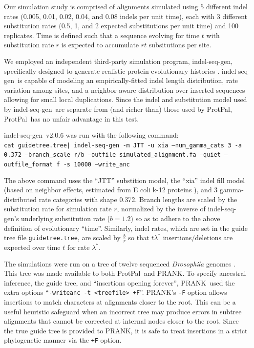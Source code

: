 \documentclass{article}
\begin{document}
\newcommand{\indelseqgen}{indel-seq-gen}
\newcommand{\protpal}{ProtPal}
\newcommand{\prank}{PRANK}
\newcommand{\clustalw}{CLUSTALW}
\newcommand{\rateRatio}[1]{\frac{\hat{\lambda}^{#1}_{\hat{H}}}{\lambda^#1}}
Our simulation study is comprised of alignments simulated  using 5 different indel rates (0.005, 0.01, 0.02, 0.04, and 0.08 indels per unit time), each with 3 different substitution rates (0.5, 1, and 2 expected  substitutions per unit time) and 100 replicates.  
Time is defined such that a sequence evolving for time $t$ with substitution rate $r$ is expected to accumulate $rt$ subsitutions per site. 

 We employed an independent third-party simulation program, \indelseqgen, specifically designed to generate realistic protein evolutionary histories \cite{StropeEtAl2009}.  \indelseqgen\ is capable of modeling an empirically-fitted indel length distribution, rate variation among sites, and a neighbor-aware distribution over inserted sequences allowing for small  local duplications.  Since the indel and substitution model used by \indelseqgen\ are separate from (and richer than) those used by \protpal, \protpal\ has no unfair advantage in this test.

\noindent \indelseqgen\ v2.0.6 was run with the following command:\\
{\tt cat guidetree.tree| indel-seq-gen -m JTT -u xia --num\_gamma\_cats 3 -a 0.372 --branch\_scale r/b --outfile simulated\_alignment.fa  --quiet --outfile\_format f -s 10000  --write\_anc}


The above command uses the ``JTT'' substition model,  the ``xia'' indel fill model (based on neighbor effects, estimated from E coli k-12 proteins \cite{StropeEtAl2009}), and 3 gamma-distributed rate categories with shape 0.372.  Branch lengths are scaled by the substitution rate for simulation rate $r$, normalized by the inverse of \indelseqgen's underlying substitution rate ($b=1.2$) so as to adhere to the above definition of evolutionary ``time''.   Similarly, indel rates, which are set in the guide tree file {\tt guidetree.tree}, are scaled by $\frac{b}{r}$ so that $t\lambda^*$ insertions/deletions are expected over time $t$ for rate $\lambda^*$.

The  simulations were run on a tree of twelve sequenced {\em Drosophila} genomes \cite{ClarkEtAl2007}.
This  tree was made available to both \protpal\ and  \prank.
To specify ancestral inference, the guide tree, and ``insertions opening forever'', \prank\ used the extra options
``{\tt -writeanc -t <treefile> +F}''.
\prank's {\tt -F} option allows insertions to match characters at alignments closer to the root.  This can be a useful heuristic safeguard when an incorrect tree may produce errors in subtree alignments that cannot be corrected at internal nodes closer to the root.  
Since the true guide tree is provided to \prank,  it is safe to treat insertions in a strict phylogenetic manner via the {\tt +F} option.  
\end{document}
